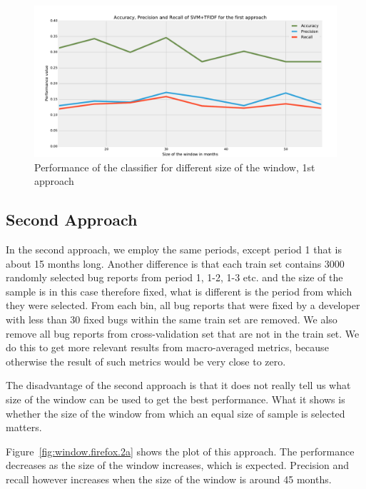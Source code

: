 \begin{figure}[htbp]
    \centering
        \includegraphics[width=\textwidth]{./images/window_size/firefox_1a.pdf}
    \caption{Performance of the classifier for different size of the window, 1st approach}
    \label{fig:window.firefox.1a}
\end{figure}

\subsection{Second Approach}

In the second approach, we employ the same periods, except period 1 that is about 15 months long. Another difference is that each train set contains 3000 randomly selected bug reports from period 1, 1-2, 1-3 etc. and the size of the sample is in this case therefore fixed, what is different is the period from which they were selected. From each bin, all bug reports that were fixed by a developer with less than 30 fixed bugs within the same train set are removed. We also remove all bug reports from cross-validation set that are not in the train set. We do this to get more relevant results from macro-averaged metrics, because otherwise the result of such metrics would be very close to zero.

The disadvantage of the second approach is that it does not really tell us what size of the window can be used to get the best performance. What it shows is whether the size of the window from which an equal size of sample is selected matters.

Figure~\ref{fig:window.firefox.2a} shows the plot of this approach. The performance decreases as the size of the window increases, which is expected. Precision and recall however increases when the size of the window is around 45 months.~

